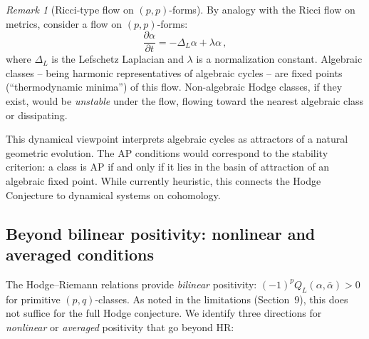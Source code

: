 \documentclass[aps,prd,twocolumn,superscriptaddress,nofootinbib]{revtex4-2}
\theoremstyle{definition}
\theoremstyle{remark}
\newtheorem{remark}[theorem]{Remark}
\begin{document}
\begin{remark}[Ricci-type flow on $(p,p)$-forms]
\label{rem:ricci-flow}
By analogy with the Ricci flow on metrics, consider a flow on $(p,p)$-forms:
\begin{equation}
\frac{\partial \alpha}{\partial t} = -\Delta_L \alpha + \lambda \alpha\,,
\end{equation}
where $\Delta_L$ is the Lefschetz Laplacian and $\lambda$ is a normalization constant. Algebraic classes -- being harmonic representatives of algebraic cycles -- are fixed points (``thermodynamic minima'') of this flow. Non-algebraic Hodge classes, if they exist, would be \textit{unstable} under the flow, flowing toward the nearest algebraic class or dissipating.

This dynamical viewpoint interprets algebraic cycles as attractors of a natural geometric evolution. The AP conditions would correspond to the stability criterion: a class is AP if and only if it lies in the basin of attraction of an algebraic fixed point. While currently heuristic, this connects the Hodge Conjecture to dynamical systems on cohomology.
\end{remark}

\subsection{Beyond bilinear positivity: nonlinear and averaged conditions}
\label{sec:nonlinear-positivity}

The Hodge--Riemann relations provide \emph{bilinear} positivity: $(-1)^p Q_L(\alpha, \bar\alpha) > 0$ for primitive $(p,q)$-classes. As noted in the limitations (Section~9), this does not suffice for the full Hodge conjecture. We identify three directions for \emph{nonlinear} or \emph{averaged} positivity that go beyond HR:
\end{document}

